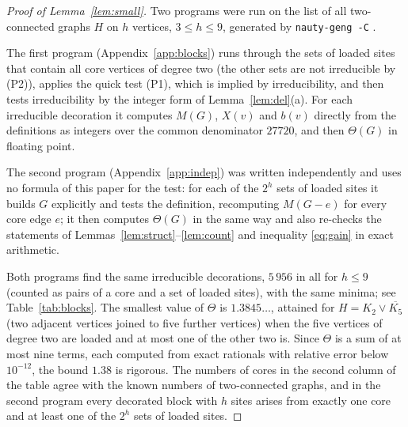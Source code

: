 \documentclass[11pt,a4paper]{article}
\theoremstyle{definition}
\theoremstyle{remark}
\numberwithin{equation}{section}
\begin{document}
\begin{proof}[Proof of Lemma~\ref{lem:small}]
Two programs were run on the list of all two-connected graphs $H$ on $h$ vertices,
$3\le h\le9$, generated by \texttt{nauty-geng -C} \cite{nauty}.

The first program (Appendix~\ref{app:blocks}) runs through the sets of loaded sites
that contain all core vertices of degree two (the other sets are not irreducible by
(P2)), applies the quick test (P1), which is implied by irreducibility, and then
tests irreducibility by the integer form of Lemma~\ref{lem:del}(a). For each
irreducible decoration it computes $M(G)$, $X(v)$ and $b(v)$ directly from the
definitions as integers over the common denominator $27720$, and then $\Theta(G)$ in
floating point.

The second program (Appendix~\ref{app:indep}) was written independently and uses no
formula of this paper for the test: for each of the $2^h$ sets of loaded sites it
builds $G$ explicitly and tests the definition, recomputing $M(G-e)$ for every core
edge $e$; it then computes $\Theta(G)$ in the same way and also re-checks the
statements of Lemmas~\ref{lem:struct}--\ref{lem:count} and inequality
\eqref{eq:gain} in exact arithmetic.

Both programs find the same irreducible decorations, $5\,956$ in all for $h\le9$
(counted as pairs of a core and a set of loaded sites), with the same minima; see
Table~\ref{tab:blocks}. The smallest value of $\Theta$ is $1.3845\ldots$, attained
for $H=K_2\vee\overline{K_5}$ (two adjacent vertices joined to five further
vertices) when the five vertices of degree two are loaded and at most one of the
other two is. Since $\Theta$ is a sum of at most nine terms, each computed from
exact rationals with relative error below $10^{-12}$, the bound $1.38$ is rigorous.
The numbers of cores in the second column of the table agree with the known numbers
of two-connected graphs, and in the second program every decorated block with $h$
sites arises from exactly one core and at least one of the $2^h$ sets of loaded
sites.
\end{proof}
\end{document}
